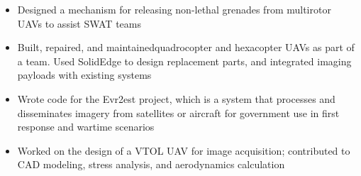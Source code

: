 \documentclass[10pt,a4paper]{article}
\begin{document}
\begin{itemize}
  \item Designed a mechanism for releasing non-lethal grenades from multirotor UAVs to
    assist SWAT teams
  \item Built, repaired, and maintainedquadrocopter and hexacopter UAVs as part of a
    team. Used SolidEdge to design replacement parts, and integrated imaging
    payloads with existing systems
  \item Wrote code for the Evr2est project, which is a system that processes and
    disseminates imagery from satellites or aircraft for government use in first
    response and wartime scenarios
  \item Worked on the design of a VTOL UAV for image acquisition; contributed to CAD
    modeling, stress analysis, and aerodynamics calculation
\end{itemize}
\end{document}
